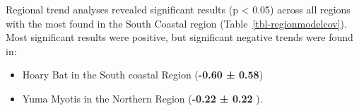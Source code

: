 \documentclass[
  letterpaper,
  DIV=11,
  numbers=noendperiod]{scrartcl}
\begin{document}
Regional trend analyses revealed significant results (p \textless{}
0.05) across all regions with the most found in the South Coastal region
(Table~\ref{tbl-regionmodelcov}). Most significant results were
positive, but significant negative trends were found in:

\begin{itemize}
\item
  Hoary Bat in the South coastal Region (\textbf{-0.60 ± 0.58})
\item
  Yuma Myotis in the Northern Region (\textbf{-0.22 ± 0.22} ).
\end{itemize}

\begin{table}[H]

\caption{\label{tbl-regionmodelcov}Regional trend estimates from
2017-2024 NABat monitoring in BC adjusted for covariates. Trends
estimated on a logarithmic scale, thus a trend estimate of 0.05
corresponds to an annual change of 5\%. Significant results (p value
\textless{} 0.05) are highlighted in bold.}

\centering{

}
\end{table}
\end{document}
